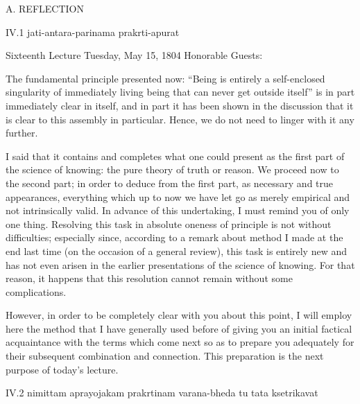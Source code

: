 A. REFLECTION

IV.1
jati-antara-parinama prakrti-apurat

Sixteenth Lecture
Tuesday, May 15, 1804
Honorable Guests:

The fundamental principle presented now:
“Being is entirely a self-enclosed singularity
of immediately living being
that can never get outside itself”
is in part immediately clear in itself,
and in part it has been shown in the discussion
that it is clear to this assembly in particular.
Hence, we do not need to linger with it any further.

I said that it contains and completes
what one could present as the first part
of the science of knowing:
the pure theory of truth or reason.
We proceed now to the second part;
in order to deduce from the first part,
as necessary and true appearances,
everything which up to now we have
let go as merely empirical
and not intrinsically valid.
In advance of this undertaking,
I must remind you of only one thing.
Resolving this task in absolute oneness
of principle is not without difficulties;
especially since, according to a remark about method
I made at the end last time
(on the occasion of a general review),
this task is entirely new
and has not even arisen in the earlier
presentations of the science of knowing.
For that reason, it happens that this resolution
cannot remain without some complications.

However, in order to be completely clear with you about this point,
I will employ here the method that I have generally used before
of giving you an initial factical acquaintance with the terms
which come next so as to prepare you adequately
for their subsequent combination and connection.
This preparation is the next purpose of today's lecture.

IV.2
nimittam aprayojakam prakrtinam varana-bheda tu tata ksetrikavat

